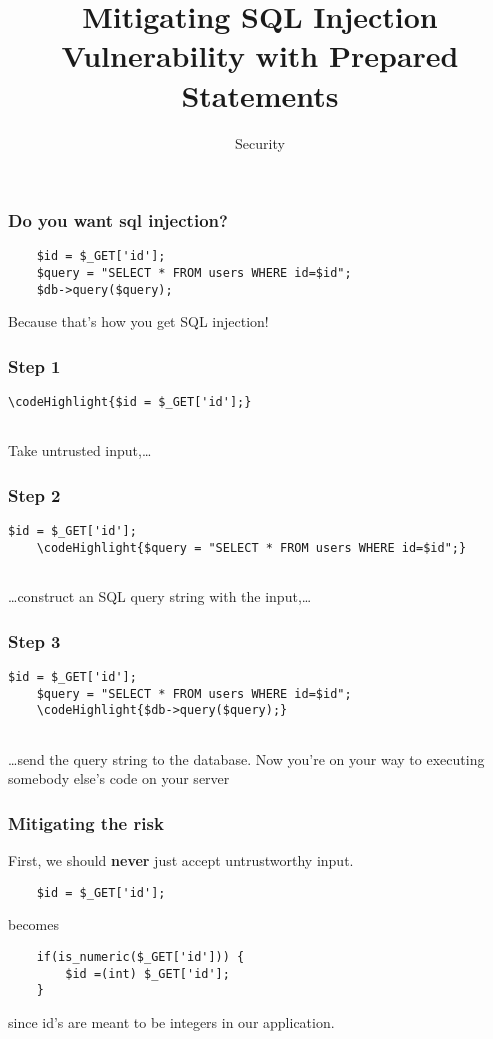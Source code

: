 \documentclass[10pt]{beamer}
\title{Mitigating SQL Injection Vulnerability with Prepared Statements}
\author[IN618]{Security}
\institute[Otago Polytechnic]{
  Otago Polytechnic \\
  Dunedin, New Zealand \\
}
\date{}
\newcommand\codeHighlight[1]{\textcolor[rgb]{1,0,0}{\textbf{#1}}}
\begin{document}
\begin{frame}[plain]
  \titlepage
\end{frame}



\begin{frame}[fragile]
	\frametitle{Do you want sql injection?}
	\begin{verbatim}
    $id = $_GET['id'];
    $query = "SELECT * FROM users WHERE id=$id";
    $db->query($query);
	\end{verbatim}
	
	Because that's how you get SQL injection!
\end{frame}


\begin{frame}[fragile]
	\frametitle{Step 1}
	\begin{Verbatim}[commandchars=\\\{\}]
	\codeHighlight{$id = $_GET['id'];}
	
	\end{Verbatim}
	
	Take untrusted input,\ldots
\end{frame}

\begin{frame}[fragile]
	\frametitle{Step 2}
	\begin{Verbatim}[commandchars=\\\{\}]
	$id = $_GET['id'];
	\codeHighlight{$query = "SELECT * FROM users WHERE id=$id";}
	
	\end{Verbatim}
	
	\ldots construct an SQL query string with the input,\ldots
\end{frame}

\begin{frame}[fragile]
	\frametitle{Step 3}
	\begin{Verbatim}[commandchars=\\\{\}]
	$id = $_GET['id'];
	$query = "SELECT * FROM users WHERE id=$id";
	\codeHighlight{$db->query($query);}
	
	\end{Verbatim}
	
	\ldots send the query string to the database. Now you're on your way to executing somebody else's code on your server
\end{frame}

\begin{frame}[fragile]
	\frametitle{Mitigating the risk}
	
	First, we should \textbf{never} just accept untrustworthy input.
	
	\begin{verbatim}
	$id = $_GET['id'];
	\end{verbatim}
	
	becomes
	
	\begin{verbatim}
	if(is_numeric($_GET['id'])) {
	    $id =(int) $_GET['id'];
	}
	\end{verbatim}
	
	since id's are meant to be integers in our application.
	
	
\end{frame}
\end{document}
